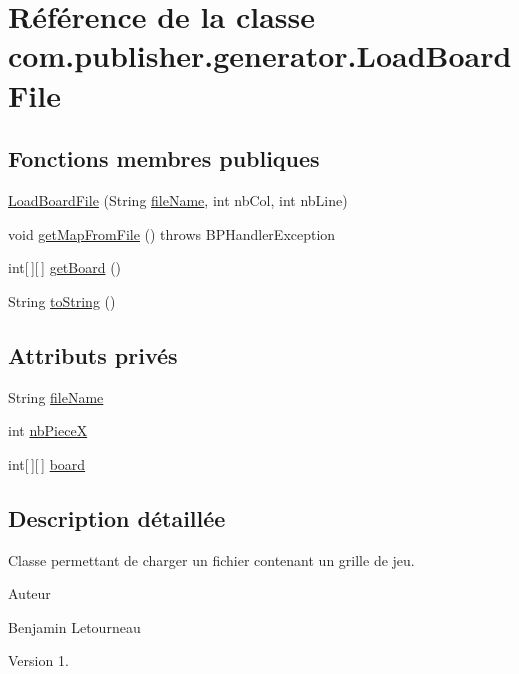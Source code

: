 \hypertarget{classcom_1_1publisher_1_1generator_1_1LoadBoardFile}{\section{Référence de la classe com.\-publisher.\-generator.\-Load\-Board\-File}
\label{classcom_1_1publisher_1_1generator_1_1LoadBoardFile}
}
\subsection*{Fonctions membres publiques}
\begin{DoxyCompactItemize}
\item 
\hyperlink{classcom_1_1publisher_1_1generator_1_1LoadBoardFile_a49e4e2fcd5e0412ab1738fca6afcf7fd}{Load\-Board\-File} (String \hyperlink{classcom_1_1publisher_1_1generator_1_1LoadBoardFile_a0799f71c15c27e5104b856399507777f}{file\-Name}, int nb\-Col, int nb\-Line)
\item 
void \hyperlink{classcom_1_1publisher_1_1generator_1_1LoadBoardFile_a0ba3fce6f693a446a815cfa400143602}{get\-Map\-From\-File} ()  throws B\-P\-Handler\-Exception 
\item 
int\mbox{[}$\,$\mbox{]}\mbox{[}$\,$\mbox{]} \hyperlink{classcom_1_1publisher_1_1generator_1_1LoadBoardFile_a1ad92d5290598d26ebb8365aa2825e6f}{get\-Board} ()
\item 
String \hyperlink{classcom_1_1publisher_1_1generator_1_1LoadBoardFile_ae66d5827d48dc0ce07c07010af1d45db}{to\-String} ()
\end{DoxyCompactItemize}
\subsection*{Attributs privés}
\begin{DoxyCompactItemize}
\item 
String \hyperlink{classcom_1_1publisher_1_1generator_1_1LoadBoardFile_a0799f71c15c27e5104b856399507777f}{file\-Name}
\item 
int \hyperlink{classcom_1_1publisher_1_1generator_1_1LoadBoardFile_aa7c3179e325255a57289225cbc68a83f}{nb\-Piece\-X}
\item 
int\mbox{[}$\,$\mbox{]}\mbox{[}$\,$\mbox{]} \hyperlink{classcom_1_1publisher_1_1generator_1_1LoadBoardFile_a46201e34390389b894c399a8bc300438}{board}
\end{DoxyCompactItemize}


\subsection{Description détaillée}
Classe permettant de charger un fichier contenant un grille de jeu. \begin{DoxyAuthor}{Auteur}

\begin{DoxyItemize}
\item Benjamin Letourneau 
\end{DoxyItemize}
\end{DoxyAuthor}
\begin{DoxyVersion}{Version}
1. 
\end{DoxyVersion}


